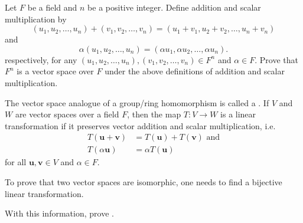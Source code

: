 \begin{problem}
    Let $F$ be a field and $n$ be a positive integer. Define addition and scalar multiplication by
    \[
        (u_1, u_2, \dots, u_n) + (v_1, v_2, \dots, v_n) = (u_1 + v_1, u_2 + v_2, \dots, u_n + v_n)
    \]
    and
    \[
        \alpha(u_1, u_2, \dots, u_n) = (\alpha u_1, \alpha u_2, \dots, \alpha u_n).
    \]
    respectively, for any $(u_1, u_2, \dots, u_n), (v_1, v_2, \dots, v_n) \in F^n$ and $\alpha \in F$. Prove that $F^n$ is a vector space over $F$ under the above definitions of addition and scalar multiplication.
\end{problem}

\begin{problem}\label{problem-vector-space-of-dimension-n-isomorphic-to-F^n}
    The vector space analogue of a group/ring homomorphism is called a . If $V$ and $W$ are vector spaces over a field $F$, then the map $T: V \to W$ is a linear transformation if it preserves vector addition and scalar multiplication, i.e.
    \begin{align*}
        T(\textbf{u} + \textbf{v}) &= T(\textbf{u}) + T(\textbf{v}) \text{ and}\\
        T(\alpha\textbf{u}) &= \alpha T(\textbf{u})
    \end{align*}
    for all $\textbf{u}, \textbf{v} \in V$ and $\alpha \in F$.

    To prove that two vector spaces are isomorphic, one needs to find a bijective linear transformation.

    With this information, prove .
\end{problem}
